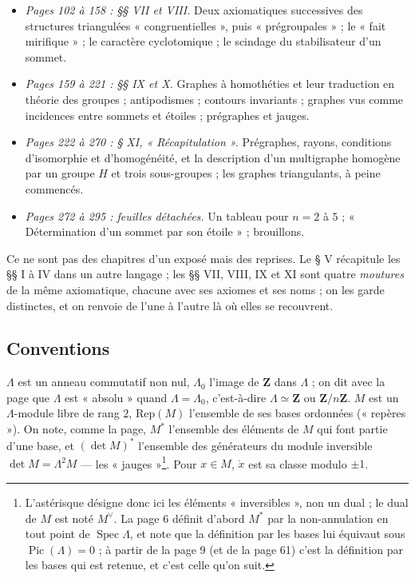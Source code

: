\documentclass[11pt,a4paper]{article}
\begin{document}
\begin{itemize}
    $\mathrm{SL}(M)'$ ; l'exception « octaédrique » ; la lecture de
    $Z'_\Lambda$ sur les étoiles.
  \item \emph{Pages 102 à 158 : §§ VII et VIII.} Deux axiomatiques
    successives des structures triangulées « congruentielles », puis
    « prégroupales » ; le « fait mirifique » ; le caractère cyclotomique ; le
    scindage du stabilisateur d'un sommet.
  \item \emph{Pages 159 à 221 : §§ IX et X.} Graphes à homothéties et leur
    traduction en théorie des groupes ; antipodismes ; contours invariants ;
    graphes vus comme incidences entre sommets et étoiles ; prégraphes et
    jauges.
  \item \emph{Pages 222 à 270 : § XI, « Récapitulation ».} Prégraphes,
    rayons, conditions d'isomorphie et d'homogénéité, et la description d'un
    multigraphe homogène par un groupe $H$ et trois sous-groupes ; les graphes
    triangulants, à peine commencés.
  \item \emph{Pages 272 à 295 : feuilles détachées.} Un tableau pour $n = 2$
    à $5$ ; « Détermination d'un sommet par son étoile » ; brouillons.
\end{itemize}

Ce ne sont pas des chapitres d'un exposé mais des reprises. Le § V récapitule
les §§ I à IV dans un autre langage ; les §§ VII, VIII, IX et XI sont quatre
\emph{moutures} de la même axiomatique, chacune avec ses axiomes et ses
noms ; on les garde distinctes, et on renvoie de l'une à l'autre là où elles se
recouvrent.

\subsection*{Conventions}

$\Lambda$ est un anneau commutatif non nul, $\Lambda_0$ l'image de $\mathbf{Z}$
dans $\Lambda$ ; on dit avec la page que $\Lambda$ est « absolu » quand
$\Lambda = \Lambda_0$, c'est-à-dire $\Lambda \simeq \mathbf{Z}$ ou
$\mathbf{Z}/n\mathbf{Z}$. $M$ est un $\Lambda$-module libre de rang $2$,
$\mathrm{Rep}(M)$ l'ensemble de ses bases ordonnées (« repères »). On note,
comme la page, $M^{*}$ l'ensemble des éléments de $M$ qui font partie d'une
base, et $(\det M)^{*}$ l'ensemble des générateurs du module inversible $\det M
= \Lambda^2 M$ --- les « jauges »\footnote{L'astérisque désigne donc ici les
éléments « inversibles », non un dual ; le dual de $M$ est noté $M^{\vee}$.
La page 6 définit d'abord $M^{*}$ par la non-annulation en tout point de
$\operatorname{Spec}\Lambda$, et note que la définition par les bases lui
équivaut sous $\operatorname{Pic}(\Lambda) = 0$ ; à partir de la page 9 (et
de la page 61) c'est la définition par les bases qui est retenue, et c'est
celle qu'on suit.}. Pour $x \in M$, $\dot{x}$ est sa classe modulo $\pm 1$.
\end{document}

